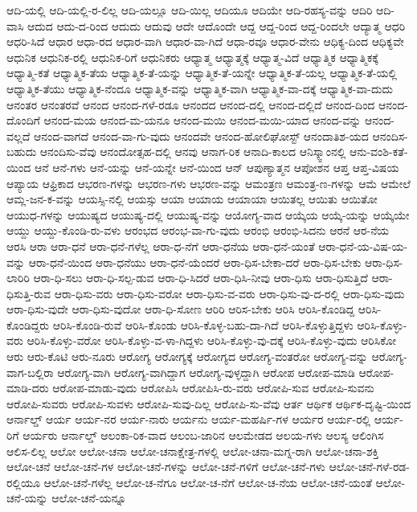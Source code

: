 {ಆದಿ-ಯಲ್ಲಿ
ಆದಿ-ಯಲ್ಲಿ-ರ-ಲಿಲ್ಲ
ಆದಿ-ಯಲ್ಲೂ
ಆದಿ-ಯಿಲ್ಲ
ಆದಿಯೂ
ಆದಿಯೇ
ಆದಿ-ರಹಸ್ಯ-ವನ್ನು
ಆದಿರಿ
ಆದಿ-ವಾಸಿ
ಆದುದ
ಆದು-ದ-ರಿಂದ
ಆದುದು
ಆದುವು
ಆದೇ
ಆದೊಂದೇ
ಆದ್ದ
ಆದ್ದ-ರಿಂದ
ಆದ್ದ-ರಿಂದಲೇ
ಆದ್ಯಾತ್ಮ
ಆಧರಿ
ಆಧರಿ-ಸಿದೆ
ಆಧಾರ
ಆಧಾ-ರದ
ಆಧಾರ-ವಾಗಿ
ಆಧಾರ-ವಾ-ಗಿದೆ
ಆಧಾ-ರವೂ
ಆಧಾರ-ವೇನು
ಆಧಿಕ್ಯ-ದಿಂದ
ಆಧಿಕ್ಯವೇ
ಆಧುನಿಕ
ಆಧುನಿಕ-ರಲ್ಲಿ
ಆಧುನಿಕ-ರಿಗೆ
ಆಧುನಿಕರು
ಆಧ್ಯಾತ್ಮ
ಆಧ್ಯಾತ್ಮಕ್ಕೆ
ಆಧ್ಯಾತ್ಮ-ವಿದೆ
ಆಧ್ಯಾತ್ಮಿಕ
ಆಧ್ಯಾತ್ಮಿಕಕ್ಕೆ
ಆಧ್ಯಾತ್ಮಿ-ಕತೆ
ಆಧ್ಯಾತ್ಮಿಕ-ತೆಯ
ಆಧ್ಯಾತ್ಮಿಕ-ತೆ-ಯನ್ನು
ಆಧ್ಯಾತ್ಮಿಕ-ತೆ-ಯನ್ನೇ
ಆಧ್ಯಾತ್ಮಿಕ-ತೆ-ಯಲ್ಲ
ಆಧ್ಯಾತ್ಮಿಕ-ತೆ-ಯಲ್ಲಿ
ಆಧ್ಯಾತ್ಮಿಕ-ತೆಯು
ಆಧ್ಯಾತ್ಮಿಕ-ನೆಂದೂ
ಆಧ್ಯಾತ್ಮಿಕ-ವನ್ನು
ಆಧ್ಯಾತ್ಮಿಕ-ವಾಗಿ
ಆಧ್ಯಾತ್ಮಿಕ-ವಾ-ದಕ್ಕೆ
ಆಧ್ಯಾತ್ಮಿಕ-ವಾ-ದುದು
ಆನಂತರ
ಆನಂತರವೆ
ಆನಂದ
ಆನಂದ-ಗಳೆ-ರಡೂ
ಆನಂದದ
ಆನಂದ-ದಲ್ಲಿ
ಆನಂದ-ದಲ್ಲಿದೆ
ಆನಂದ-ದಿಂದ
ಆನಂದ-ದೊಂದಿಗೆ
ಆನಂದ-ಮಯ
ಆನಂದ-ಮ-ಯನೂ
ಆನಂದ-ಮಯಿ
ಆನಂದ-ಮಯಿ-ಯಾದ
ಆನಂದ-ವನ್ನು
ಆನಂದ-ವಲ್ಲದೆ
ಆನಂದ-ವಾಗದೆ
ಆನಂದ-ವಾ-ಗು-ವುದು
ಆನಂದವೇ
ಆನಂದ-ಹೋಲಿಘೋಸ್ಟ್
ಆನಂದಾತಿಶ-ಯದ
ಆನಂದಿಸ-ಬಹುದು
ಆನಂದಿಸು-ವೆವು
ಆನಂದೋತ್ಸಹ-ದಲ್ಲಿ
ಆನವು
ಆನಾಗ-ರಿಕ
ಆನಾದಿ-ಕಾಲದ
ಆನಿಸ್ಕ್ವಾಂನಲ್ಲಿ
ಆನು-ವಂಶಿ-ಕತೆ-ಯಿಂದ
ಆನೆ
ಆನೆ-ಗಳು
ಆನೆ-ಯನ್ನು
ಆನೆ-ಯನ್ನೇ
ಆನೆ-ಯಿಂದ
ಆನ್
ಆಪುಣ್ಯಾತ್ಮನ
ಆಪೋಶನ
ಆಪ್ತ
ಆಪ್ತ-ವಿಷಯ
ಆಪ್ಯಾಯ
ಆಫ್ರಿಕಾದ
ಆಭರಣ-ಗಳನ್ನು
ಆಭರಣ-ಗಳು
ಆಭರಣ-ವನ್ನು
ಆಮಂತ್ರಣ
ಆಮಂತ್ರ-ಣ-ಗಳನ್ನು
ಆಮೆ
ಆಮೇಲೆ
ಆಮ್ಲ-ಜನ-ಕ-ವನ್ನು
ಆಯಸ್ಸಿ-ನಲ್ಲಿ
ಆಯಸ್ಸು
ಆಯಾ
ಆಯಾಯ
ಆಯಾಯಾ
ಆಯಿತಲ್ಲ
ಆಯಿತು
ಆಯಿತೋ
ಆಯುಧ-ಗಳನ್ನು
ಆಯುಷ್ಯದ
ಆಯುಷ್ಯ-ದಲ್ಲಿ
ಆಯುಷ್ಯ-ವನ್ನು
ಆಯೋಗ್ಯ-ವಾದ
ಆಯ್ಕೆಯ
ಆಯ್ಕೆ-ಯನ್ನು
ಆಯ್ಕೆಯೇ
ಆಯ್ದು
ಆಯ್ದು-ಕೊಂಡಿ-ರು-ವಳು
ಆರಂಭದ
ಆರಂಭ-ವಾ-ಗು-ವುದು
ಆರಂಭಿ
ಆರಂಭಿ-ಸಿದನು
ಆರನೆ
ಆರ-ನೆಯ
ಆರಸಿ
ಆರಾ
ಆರಾ-ಧನೆ
ಆರಾ-ಧನೆ-ಗಳೆಲ್ಲ
ಆರಾ-ಧ-ನೆಗೆ
ಆರಾ-ಧನೆಯ
ಆರಾ-ಧನೆ-ಯಂತೆ
ಆರಾ-ಧನೆ-ಯ-ವಿಷ-ಯ-ವನ್ನು
ಆರಾ-ಧನೆ-ಯಿಂದ
ಆರಾ-ಧನೆಯು
ಆರಾ-ಧನೆ-ಯೆಂದರೆ
ಆರಾ-ಧಿಸ-ಬೇಕಾ-ದರೆ
ಆರಾ-ಧಿಸ-ಬೇಕು
ಆರಾ-ಧಿಸ-ಲಾರಿರಿ
ಆರಾ-ಧಿ-ಸಲು
ಆರಾ-ಧಿ-ಸಲ್ಪ-ಡುವ
ಆರಾ-ಧಿ-ಸಿದರೆ
ಆರಾ-ಧಿಸಿ-ನೀವು
ಆರಾ-ಧಿಸು
ಆರಾ-ಧಿಸುತ್ತಿದೆ
ಆರಾ-ಧಿಸುತ್ತಿ-ರುವ
ಆರಾ-ಧಿಸು-ವರು
ಆರಾ-ಧಿಸು-ವರೋ
ಆರಾ-ಧಿಸು-ವ-ವರು
ಆರಾ-ಧಿಸು-ವು-ದ-ರಲ್ಲಿ
ಆರಾ-ಧಿಸು-ವುದು
ಆರಾ-ಧಿಸು-ವುದೇ
ಆರಾ-ಧಿಸು-ವುದೋ
ಆರಾ-ಧಿ-ಸೋಣ
ಆರಿರಿ
ಆರಿಸ-ಬೇಕು
ಆರಿಸಿ
ಆರಿಸಿ-ಕೊಂಡಿದ್ದ
ಆರಿಸಿ-ಕೊಂಡಿದ್ದರು
ಆರಿಸಿ-ಕೊಂಡಿ-ರುವೆ
ಆರಿಸಿ-ಕೊಂಡು
ಆರಿಸಿ-ಕೊಳ್ಳ-ಬಹು-ದಾ-ಗಿದೆ
ಆರಿಸಿ-ಕೊಳ್ಳುತ್ತಿದ್ದಳು
ಆರಿಸಿ-ಕೊಳ್ಳು-ವರು
ಆರಿಸಿ-ಕೊಳ್ಳು-ವರೋ
ಆರಿಸಿ-ಕೊಳ್ಳು-ವ-ಳಾ-ಗಿದ್ದಳು
ಆರಿಸಿ-ಕೊಳ್ಳು-ವು-ದಕ್ಕೆ
ಆರಿಸಿ-ಕೊಳ್ಳು-ವುದು
ಆರಿಸಿಕೋ
ಆರು
ಆರು-ಕೊಟಿ
ಆರು-ನೂರು
ಆರೋಗ್ಯ
ಆರೋಗ್ಯಕ್ಕೆ
ಆರೋಗ್ಯದ
ಆರೋಗ್ಯ-ವಂತರೋ
ಆರೋಗ್ಯ-ವನ್ನು
ಆರೋಗ್ಯ-ವಾಗ-ಬಲ್ಲಿರಾ
ಆರೋಗ್ಯ-ವಾಗಿ
ಆರೋಗ್ಯ-ವಾಗಿದ್ದಾಗ
ಆರೋಗ್ಯ-ವುಳ್ಳದ್ದಾಗಿ
ಆರೋಪ
ಆರೋಪ-ಮಾಡಿ
ಆರೋಪ-ಮಾಡಿ-ದರು
ಆರೋಪ-ಮಾಡು-ವುದು
ಆರೋಪಿಸಿ
ಆರೋಪಿಸಿ-ರು-ವರು
ಆರೋಪಿ-ಸುವ
ಆರೋಪಿ-ಸುವನು
ಆರೋಪಿ-ಸುವರು
ಆರೋಪಿ-ಸುವಳು
ಆರೋಪಿ-ಸುವು-ದಿಲ್ಲ
ಆರೋಪಿ-ಸು-ವೆವು
ಆರ್ತ
ಆರ್ಥಿಕ
ಆರ್ಥಿಕ-ದೃಷ್ಟಿ-ಯಿಂದ
ಆರ್ನಾಲ್ಡ್
ಆರ್ಯ
ಆರ್ಯ-ನರ
ಆರ್ಯ-ನಾರು
ಆರ್ಯನು
ಆರ್ಯ-ಮಹರ್ಷಿ-ಗಳ
ಆರ್ಯರ
ಆರ್ಯ-ರಲ್ಲಿ
ಆರ್ಯ-ರಿಗೆ
ಆರ್ಯರು
ಆರ್ನಾಲ್ಡ್
ಆಲಂಕಾ-ರಿಕ-ವಾದ
ಆಲಂಬ-ಜಾರಿನ
ಆಲಮೇಡದ
ಆಲಯ-ಗಳು
ಆಲಸ್ಯ
ಆಲಿಂಗಿಸ
ಆಲಿಸ-ಲಿಲ್ಲ
ಆಲೋ
ಆಲೋ-ಚನಾ
ಆಲೋ-ಚನಾಕ್ಷೇತ್ರ-ಗಳಲ್ಲಿ
ಆಲೋ-ಚನಾ-ಮಗ್ನ-ರಾಗಿ
ಆಲೋ-ಚನಾ-ಶಕ್ತಿ
ಆಲೋ-ಚನೆ
ಆಲೋ-ಚನೆ-ಗಳ
ಆಲೋ-ಚನೆ-ಗಳನ್ನು
ಆಲೋ-ಚನೆ-ಗಳಿಗೆ
ಆಲೋ-ಚನೆ-ಗಳು
ಆಲೋ-ಚನೆ-ಗಳೆ-ರಡ-ರಲ್ಲಿಯೂ
ಆಲೋ-ಚನೆ-ಗಳೆಲ್ಲ
ಆಲೋ-ಚ-ನೆಗೂ
ಆಲೋ-ಚ-ನೆಗೆ
ಆಲೋ-ಚ-ನೆಯ
ಆಲೋ-ಚನೆ-ಯಂತೆ
ಆಲೋ-ಚನೆ-ಯನ್ನು
ಆಲೋ-ಚನೆ-ಯನ್ನೂ
}
